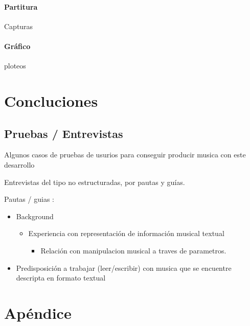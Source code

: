 \documentclass[]{article}
\providecommand{\tightlist}{%
  \setlength{\itemsep}{0pt}\setlength{\parskip}{0pt}}
\let\oldparagraph\paragraph
\renewcommand{\paragraph}[1]{\oldparagraph{#1}\mbox{}}
\begin{document}
\hypertarget{partitura-2}{%
\paragraph{Partitura}\label{partitura-2}}

Capturas

\hypertarget{gruxe1fico-2}{%
\paragraph{Gráfico}\label{gruxe1fico-2}}

ploteos

\newpage

\hypertarget{concluciones}{%
\section{Concluciones}\label{concluciones}}

\hypertarget{pruebas-entrevistas}{%
\subsection{Pruebas / Entrevistas}\label{pruebas-entrevistas}}

Algunos casos de pruebas de usurios para conseguir producir musica con
este desarrollo

Entrevistas del tipo no estructuradas, por pautas y guías.

Pautas / guias :

\begin{itemize}
\item
  Background

  \begin{itemize}
  \item
    Experiencia con representación de información musical textual

    \begin{itemize}
    \tightlist
    \item
      Relación con manipulacion musical a traves de parametros.
    \end{itemize}
  \end{itemize}
\item
  Predisposición a trabajar (leer/escribir) con musica que se encuentre
  descripta en formato textual
\end{itemize}

\hypertarget{apuxe9ndice}{%
\section{Apéndice}\label{apuxe9ndice}}
\end{document}
